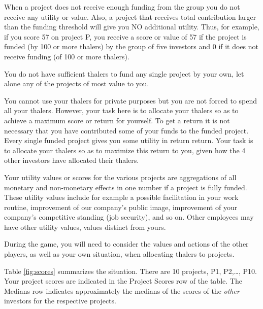 \documentclass[11pt, oneside]{article}   	%
\begin{document}
When a project does not receive enough funding from the group you do not receive any utility or value. Also,  a project that receives total contribution larger  than the funding threshold will give you NO additional utility. Thus, for example, if you score 57 on project P, you receive a score or value of 57 if the project is funded (by 100 or more thalers) by the group of five investors and 0 if it does not receive funding (of 100 or more thalers). 

You do not have sufficient thalers to fund any single project by your own, let alone any of the projects of most value to you.

You cannot use your thalers for private purposes but you are not forced to spend all your thalers. However, your task here is to allocate your thalers so as to achieve a maximum score  or return for yourself. To get a return it is not necessary that you have contributed some of your funds to the funded project. Every single funded project gives you some utility in return return. Your task is to allocate your thalers so as to maximize this return to you, given how the 4 other investors have allocated their thalers.

Your  utility values or scores for the various projects are  aggregations of all monetary and non-monetary effects in one number if a project is fully funded. These utility values include for example a possible facilitation in your work routine, improvement of our company's public image, improvement of your company's competitive standing (job security), and so on. Other employees may have other utility values, values distinct from yours.

During the game, you will need to consider the values and actions of the other players, as well as your own situation, when allocating thalers to projects.


Table \ref{fig:scores} summarizes the situation. There are 10 projects, P1, P2,\ldots , P10.
Your project scores are indicated in the Project Scores row of the table. The Medians row indicates approximately the medians of the scores of the \emph{other} investors for the respective projects.
\end{document}

